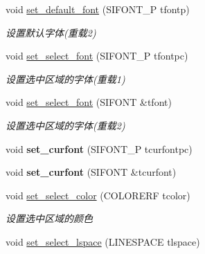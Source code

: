 \begin{DoxyCompactItemize}
void \hyperlink{class_s_i_t_e_x_t_a8fcd320042283b60f57630bdb8fd5bc8}{set\+\_\+default\+\_\+font} (S\+I\+F\+O\+N\+T\+\_\+P tfontp)
\begin{DoxyCompactList}\small\item\em 设置默认字体(重载2) \end{DoxyCompactList}\item 
\mbox{\label{class_s_i_t_e_x_t_a4e33142038f2ba1d42660dec1134d2f9}} 
void \hyperlink{class_s_i_t_e_x_t_a4e33142038f2ba1d42660dec1134d2f9}{set\+\_\+select\+\_\+font} (S\+I\+F\+O\+N\+T\+\_\+P tfontpc)
\begin{DoxyCompactList}\small\item\em 设置选中区域的字体(重载1) \end{DoxyCompactList}\item 
\mbox{\label{class_s_i_t_e_x_t_a2b1208eb0796a08112449e7273b271df}} 
void \hyperlink{class_s_i_t_e_x_t_a2b1208eb0796a08112449e7273b271df}{set\+\_\+select\+\_\+font} (S\+I\+F\+O\+NT \&tfont)
\begin{DoxyCompactList}\small\item\em 设置选中区域的字体(重载2) \end{DoxyCompactList}\item 
\mbox{\label{class_s_i_t_e_x_t_a957ff893dd8fa93cbc9df1702a8b953d}} 
void {\bfseries set\+\_\+curfont} (S\+I\+F\+O\+N\+T\+\_\+P tcurfontpc)
\item 
\mbox{\label{class_s_i_t_e_x_t_a128951fbee38cb8ba2e389441acb3fd5}} 
void {\bfseries set\+\_\+curfont} (S\+I\+F\+O\+NT \&tcurfont)
\item 
\mbox{\label{class_s_i_t_e_x_t_abfd80c912a40b72c0cb113ad147b3d33}} 
void \hyperlink{class_s_i_t_e_x_t_abfd80c912a40b72c0cb113ad147b3d33}{set\+\_\+select\+\_\+color} (C\+O\+L\+O\+R\+E\+RF tcolor)
\begin{DoxyCompactList}\small\item\em 设置选中区域的颜色 \end{DoxyCompactList}\item 
\mbox{\label{class_s_i_t_e_x_t_af79cfc54434033545610de0dc0580fa9}} 
void \hyperlink{class_s_i_t_e_x_t_af79cfc54434033545610de0dc0580fa9}{set\+\_\+select\+\_\+lspace} (L\+I\+N\+E\+S\+P\+A\+CE tlspace)

\end{DoxyCompactItemize}
